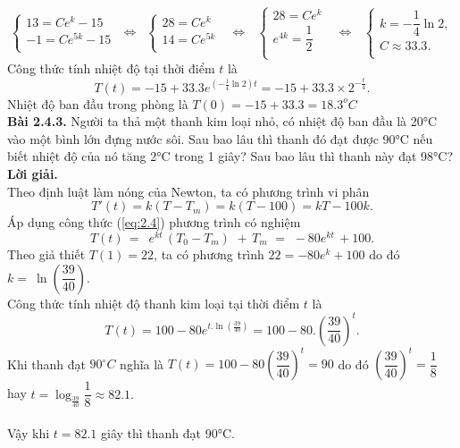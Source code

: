 $$\left\{ \begin{array}{l}
	13=C{{e}^{k}}-15 \\ 
	-1=C{{e}^{5k}}-15 \\ 
\end{array} \right.\,\,\Leftrightarrow \,\,\,\left\{ \begin{array}{l}
	 28=C{{e}^{k}} \\ 
	 14=C{{e}^{5k}} \\ 
\end{array} \right.\,\,\,\,\Leftrightarrow \,\,\,\,\left\{ \begin{array}{l}
	 28=C{{e}^{k}} \\ 
	 {{e}^{4k}}=\dfrac{1}{2} \\ 
\end{array} \right.\,\,\,\,\Leftrightarrow \,\,\,\,\left\{ \begin{array}{l}
	 k=-\dfrac{1}{4}\ln 2, \\ 
	 C\approx 33.3. \\ 
\end{array} \right.$$
Công thức tính nhiệt độ tại thời điểm $t$ là $$T(t)=-15+33.3{{e}^{(-\frac{1}{4}\ln 2)t}}=-15+33.3\times {{2}^{-\frac{t}{4}}}.$$
Nhiệt độ ban đầu trong phòng là $T(0)=-15+33.3={{18.3}^{o}}C$\\
\textbf{Bài 2.4.3.} Người ta thả một thanh kim loại nhỏ, có nhiệt độ ban đầu là 20°C vào một bình lớn đựng nước sôi. Sau bao lâu thì thanh đó đạt được 90°C nếu biết nhiệt độ của nó tăng 2°C trong 1 giây? Sau bao lâu thì thanh này đạt 98°C?\\
\textbf{Lời giải. }\\
Theo định luật làm nóng của Newton, ta có phương trình vi phân
$$T'(t)=k(T-{{T}_{m}})=k(T-100)=kT-100k.$$
Áp dụng công thức (\ref{eq:2.4}) phương trình có nghiệm 
\[T(t)\,=\,\,\,{{e}^{kt}}\,({{T}_{0}}-{{T}_{m}})\,\,+\,{{T}_{m}}\,\,=\,\,-80{{e}^{kt}}\,+100.\]
Theo giả thiết $T(1)=22$, ta có phương trình $22=-80{{e}^{k}}+100$ do đó $k=~\ln \left( \dfrac{39}{40} \right).$ \\
Công thức tính nhiệt độ thanh kim loại tại thời điểm $t$ là
$$T(t)=100-80{{e}^{t.\ln (\frac{39}{40})}}=100-80.{{(\frac{39}{40})}^{t}}.$$
Khi thanh đạt $90^{\circ}C$ nghĩa là $T(t)=100-80{{(\dfrac{39}{40})}^{t}}=90$ do đó ${{(\dfrac{39}{40})}^{t}}=\dfrac{1}{8}\,\,$\\ hay
$t={{\log }_{\frac{39}{40}}}\dfrac{1}{8}\approx 82.1.\,$ \\ \\Vậy khi $t=82.1$ giây thì thanh đạt 90°C.\\
